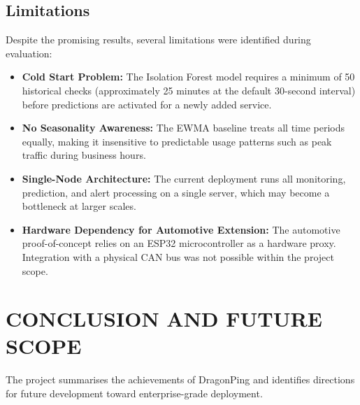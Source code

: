 \documentclass[12pt,a4paper,oneside]{report}
\begin{document}
\section{Limitations}
\noindent Despite the promising results, several limitations were identified during evaluation:
\begin{itemize}[label=\textbullet, leftmargin=*]
    \item \textbf{Cold Start Problem:} The Isolation Forest model requires a minimum of 50 historical checks (approximately 25 minutes at the default 30-second interval) before predictions are activated for a newly added service.
    \item \textbf{No Seasonality Awareness:} The EWMA baseline treats all time periods equally, making it insensitive to predictable usage patterns such as peak traffic during business hours.
    \item \textbf{Single-Node Architecture:} The current deployment runs all monitoring, prediction, and alert processing on a single server, which may become a bottleneck at larger scales.
    \item \textbf{Hardware Dependency for Automotive Extension:} The automotive proof-of-concept relies on an ESP32 microcontroller as a hardware proxy. Integration with a physical CAN bus was not possible within the project scope.
\end{itemize}
\chapter{CONCLUSION AND FUTURE SCOPE}

The project summarises the achievements of DragonPing and identifies directions for future development toward enterprise-grade deployment.
\end{document}
